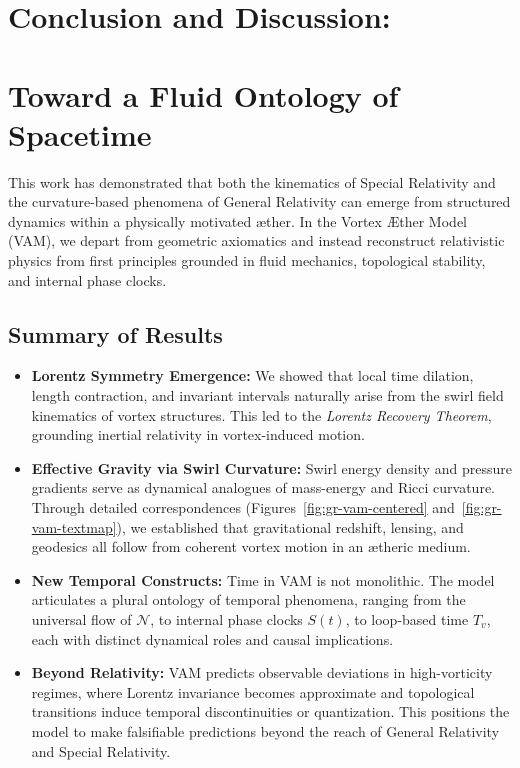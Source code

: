 \documentclass[12pt]{article}
\begin{document}


\section*{Conclusion and Discussion:}
    \section*{Toward a Fluid Ontology of Spacetime}

    This work has demonstrated that both the kinematics of Special Relativity and the curvature-based phenomena of General Relativity can emerge from structured dynamics within a physically motivated æther. In the Vortex Æther Model (VAM), we depart from geometric axiomatics and instead reconstruct relativistic physics from first principles grounded in fluid mechanics, topological stability, and internal phase clocks.

    \subsection*{Summary of Results}

    \begin{itemize}
        \item \textbf{Lorentz Symmetry Emergence:} We showed that local time dilation, length contraction, and invariant intervals naturally arise from the swirl field kinematics of vortex structures. This led to the \textit{Lorentz Recovery Theorem}, grounding inertial relativity in vortex-induced motion.

        \item \textbf{Effective Gravity via Swirl Curvature:} Swirl energy density and pressure gradients serve as dynamical analogues of mass-energy and Ricci curvature. Through detailed correspondences (Figures~\ref{fig:gr-vam-centered} and~\ref{fig:gr-vam-textmap}), we established that gravitational redshift, lensing, and geodesics all follow from coherent vortex motion in an ætheric medium.

        \item \textbf{New Temporal Constructs:} Time in VAM is not monolithic. The model articulates a plural ontology of temporal phenomena, ranging from the universal flow of \( \mathcal{N} \), to internal phase clocks \( S(t) \), to loop-based time \( T_v \), each with distinct dynamical roles and causal implications.

        \item \textbf{Beyond Relativity:} VAM predicts observable deviations in high-vorticity regimes, where Lorentz invariance becomes approximate and topological transitions induce temporal discontinuities or quantization. This positions the model to make falsifiable predictions beyond the reach of General Relativity and Special Relativity.
    \end{itemize}
\end{document}
